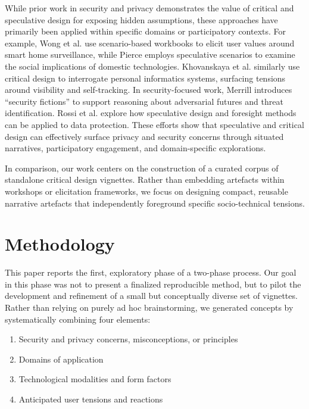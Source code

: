 While prior work in security and privacy demonstrates the value of critical and speculative design for exposing hidden assumptions, these approaches have primarily been applied within specific domains or participatory contexts. For example, Wong et al.\cite{wong2023broadening} use scenario-based workbooks to elicit user values around smart home surveillance, while Pierce \cite{pierce2019lamps} employs speculative scenarios to examine the social implications of domestic technologies. Khovanskaya et al. \cite{khovanskaya2013everybody} similarly use critical design to interrogate personal informatics systems, surfacing tensions around visibility and self-tracking. In security-focused work, Merrill  \cite{merrill2020security} introduces ``security fictions'' to support reasoning about adversarial futures and threat identification. Rossi et al. \cite{rossi2022if} explore how speculative design and foresight methods can be applied to data protection. These efforts show that speculative and critical design can effectively surface privacy and security concerns through situated narratives, participatory engagement, and domain-specific explorations. 

In comparison, our work centers on the construction of a curated corpus of standalone critical design vignettes. Rather than embedding artefacts within workshops or elicitation frameworks, we focus on designing compact, reusable narrative artefacts that independently foreground specific socio-technical tensions.



\section{Methodology}

This paper reports the first, exploratory phase of a two-phase process. Our goal in this phase was not to present a finalized reproducible method, but to pilot the development and refinement of a small but conceptually diverse set of vignettes. Rather than relying on purely ad hoc brainstorming, we generated concepts by systematically combining four elements: 

	\begin{enumerate}
		\item Security and privacy concerns, misconceptions, or principles
		\item Domains of application
		\item Technological modalities and form factors 
		\item Anticipated user tensions and reactions
	\end{enumerate}

